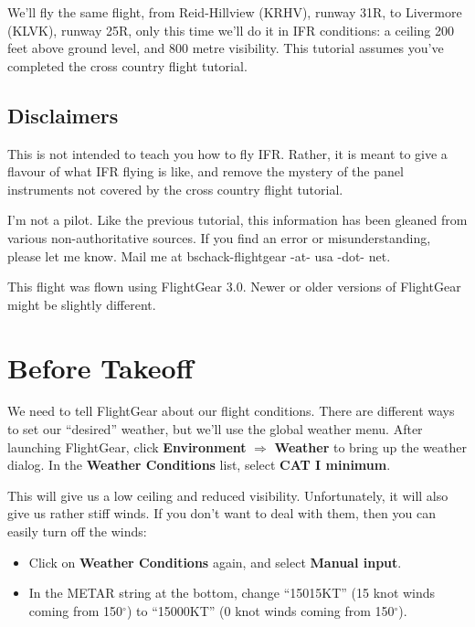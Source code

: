 We'll fly the same flight, from Reid-Hillview (KRHV), runway 31R, to
Livermore (KLVK), runway 25R, only this time we'll do it in IFR
conditions: a ceiling 200 feet above ground level, and 800 metre
visibility.  This tutorial assumes you've completed the cross country
flight tutorial.

\subsection{Disclaimers}

This is not intended to teach you how to fly IFR.  Rather, it is meant
to give a flavour of what IFR flying is like, and remove the mystery
of the panel instruments not covered by the cross country flight
tutorial.

I'm not a pilot.  Like the previous tutorial, this information has
been gleaned from various non-authoritative sources.  If you find an
error or misunderstanding, please let me know.  Mail me at
bschack-flightgear -at- usa -dot- net.

This flight was flown using FlightGear 3.0.  Newer or older versions
of FlightGear might be slightly different.

\section{Before Takeoff}

We need to tell FlightGear about our flight conditions.  There are
different ways to set our ``desired'' weather, but we'll use the
global weather menu.  After launching FlightGear, click
\textbf{\textsf{Environment}} $\Rightarrow$ \textbf{\textsf{Weather}}
to bring up the weather dialog.  In the \textbf{\textsf{Weather
    Conditions}} list, select \textbf{\textsf{CAT I minimum}}.

This will give us a low ceiling and reduced visibility.
Unfortunately, it will also give us rather stiff winds.  If you don't
want to deal with them, then you can easily turn off the winds:

\begin{itemize}
\item Click on \textbf{\textsf{Weather Conditions}} again, and select
  \textbf{\textsf{Manual input}}.
\item In the METAR string at the bottom, change ``15015KT'' (15 knot
  winds coming from 150$^\circ$) to ``15000KT'' (0 knot winds coming
  from 150$^\circ$).
\end{itemize}

